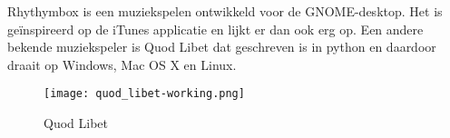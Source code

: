 Rhythymbox is een muziekspelen ontwikkeld voor de GNOME-desktop. Het is ge\"inspireerd op de iTunes applicatie en lijkt er dan ook erg op. Een andere bekende muziekspeler is Quod Libet dat geschreven is in python en daardoor draait op Windows, Mac OS X en Linux.

\begin{center}
\begin{figure}[H]
\texttt{[image: quod\_libet-working.png]}
\caption{Quod Libet}
\end{figure}
\end{center}

